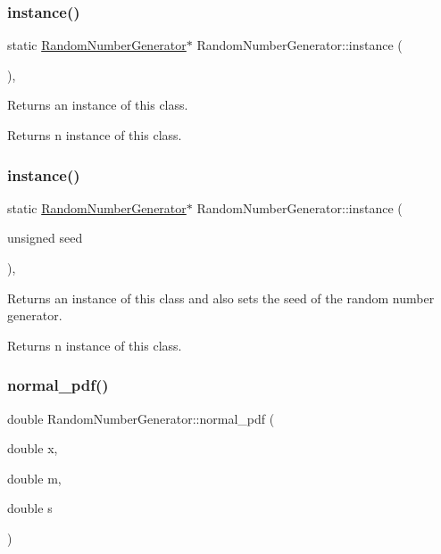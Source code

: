 \subsubsection{\texorpdfstring{instance()}{instance()}\hspace{0.1cm}{\footnotesize\ttfamily [1/2]}}
{\footnotesize\ttfamily static \hyperlink{class_random_number_generator}{Random\+Number\+Generator}$\ast$ Random\+Number\+Generator\+::instance (\begin{DoxyParamCaption}{ }\end{DoxyParamCaption})\hspace{0.3cm}{\ttfamily [inline]}, {\ttfamily [static]}}

Returns an instance of this class. \begin{DoxyReturn}{Returns}
n instance of this class. 
\end{DoxyReturn}
\mbox{\label{class_random_number_generator_acb83c75147d9d2bff7b3e3f45239ecb1}} 
\subsubsection{\texorpdfstring{instance()}{instance()}\hspace{0.1cm}{\footnotesize\ttfamily [2/2]}}
{\footnotesize\ttfamily static \hyperlink{class_random_number_generator}{Random\+Number\+Generator}$\ast$ Random\+Number\+Generator\+::instance (\begin{DoxyParamCaption}\item[{unsigned}]{seed }\end{DoxyParamCaption})\hspace{0.3cm}{\ttfamily [inline]}, {\ttfamily [static]}}

Returns an instance of this class and also sets the seed of the random number generator. \begin{DoxyReturn}{Returns}
n instance of this class. 
\end{DoxyReturn}
\mbox{\label{class_random_number_generator_a4e661a49e8dd66e13c313c99adefddb0}} 
\subsubsection{\texorpdfstring{normal\+\_\+pdf()}{normal\_pdf()}}
{\footnotesize\ttfamily double Random\+Number\+Generator\+::normal\+\_\+pdf (\begin{DoxyParamCaption}\item[{double}]{x,  }\item[{double}]{m,  }\item[{double}]{s }\end{DoxyParamCaption})}

